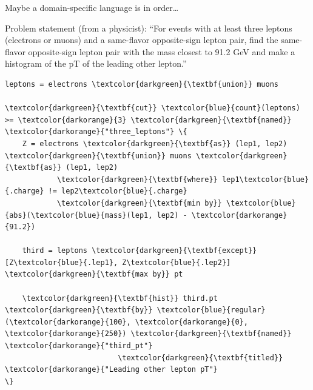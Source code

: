 \documentclass[aspectratio=169]{beamer}
\begin{document}
\begin{frame}[fragile]{Maybe a domain-specific language is in order\ldots}
\vspace{0.15 cm}
\begin{block}{Problem statement (from a physicist):}
``For events with at least three leptons (electrons or muons) and a same-flavor opposite-sign lepton pair, find the same-flavor opposite-sign lepton pair with the mass closest to 91.2 GeV and make a histogram of the pT of the leading other lepton.''
\end{block}

\small
\vspace{0.1 cm}
\begin{Verbatim}[commandchars=\\\{\}]
leptons = electrons \textcolor{darkgreen}{\textbf{union}} muons

\textcolor{darkgreen}{\textbf{cut}} \textcolor{blue}{count}(leptons) >= \textcolor{darkorange}{3} \textcolor{darkgreen}{\textbf{named}} \textcolor{darkorange}{"three_leptons"} \{
    Z = electrons \textcolor{darkgreen}{\textbf{as}} (lep1, lep2) \textcolor{darkgreen}{\textbf{union}} muons \textcolor{darkgreen}{\textbf{as}} (lep1, lep2)
            \textcolor{darkgreen}{\textbf{where}} lep1\textcolor{blue}{.charge} != lep2\textcolor{blue}{.charge}
            \textcolor{darkgreen}{\textbf{min by}} \textcolor{blue}{abs}(\textcolor{blue}{mass}(lep1, lep2) - \textcolor{darkorange}{91.2})

    third = leptons \textcolor{darkgreen}{\textbf{except}} [Z\textcolor{blue}{.lep1}, Z\textcolor{blue}{.lep2}] \textcolor{darkgreen}{\textbf{max by}} pt

    \textcolor{darkgreen}{\textbf{hist}} third.pt \textcolor{darkgreen}{\textbf{by}} \textcolor{blue}{regular}(\textcolor{darkorange}{100}, \textcolor{darkorange}{0}, \textcolor{darkorange}{250}) \textcolor{darkgreen}{\textbf{named}} \textcolor{darkorange}{"third_pt"}
                          \textcolor{darkgreen}{\textbf{titled}} \textcolor{darkorange}{"Leading other lepton pT"}
\}
\end{Verbatim}
\end{frame}
\end{document}
